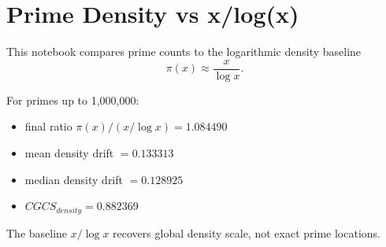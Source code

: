 \section*{Prime Density vs x/log(x)}

This notebook compares prime counts to the logarithmic density baseline
\[
\pi(x) \approx \frac{x}{\log x}.
\]

For primes up to 1,000,000:
\begin{itemize}
  \item final ratio $\pi(x)/(x/\log x) = 1.084490$
  \item mean density drift $= 0.133313$
  \item median density drift $= 0.128925$
  \item $CGCS_{density} = 0.882369$
\end{itemize}

The baseline $x/\log x$ recovers global density scale, not exact prime locations.
